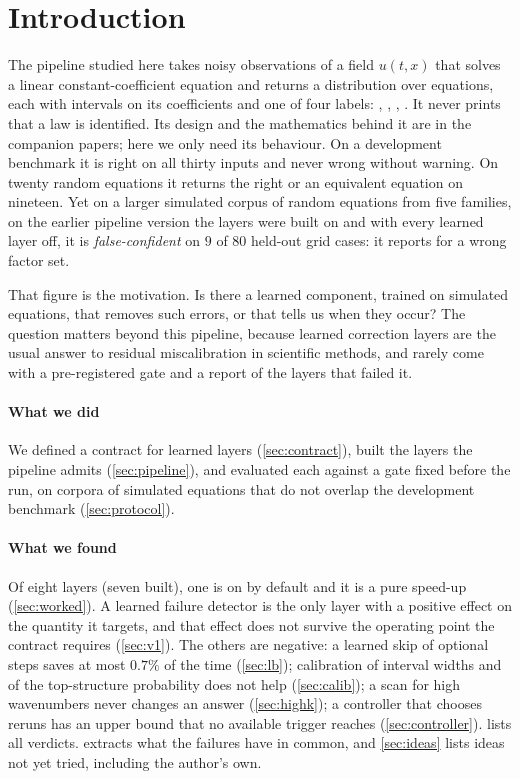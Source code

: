 \section{Introduction}\label{sec:intro}
The pipeline studied here takes noisy observations of a field $u(t,x)$ that solves a linear constant-coefficient equation
and returns a distribution over equations, each with intervals on its coefficients and one of four labels: \FC, \MIS,
\IDK, \UND{}. It never prints that a law is identified. Its design and the mathematics behind it are in the companion
papers; here we only need its behaviour. On a development benchmark it is right on all thirty inputs and never wrong
without warning. On twenty random equations it returns the right or an equivalent equation on nineteen. Yet on a larger
simulated corpus of random equations from five families, on the earlier pipeline version the layers were built on and with every learned layer off, it is \emph{false-confident} on
$9$ of $80$ held-out grid cases: it reports \FC{} for a wrong factor set.

That figure is the motivation. Is there a learned component, trained on simulated equations, that removes such errors,
or that tells us when they occur? The question matters beyond this pipeline, because learned correction layers are
the usual answer to residual miscalibration in scientific methods, and rarely come with a pre-registered gate and a
report of the layers that failed it.

\paragraph{What we did} We defined a contract for learned layers (\cref{sec:contract}), built the layers the pipeline
admits (\cref{sec:pipeline}), and evaluated each against a gate fixed before the run, on corpora of simulated equations that
do not overlap the development benchmark (\cref{sec:protocol}).

\paragraph{What we found} Of eight layers (seven built), one is on by default and it is a pure speed-up (\cref{sec:worked}). A learned
failure detector is the only layer with a positive effect on the quantity it targets, and that effect does not survive the
operating point the contract requires (\cref{sec:v1}). The others are negative: a learned skip of optional steps saves
at most $0.7\%$ of the time (\cref{sec:lb}); calibration of interval widths and of the top-structure probability does not
help (\cref{sec:calib}); a scan for high wavenumbers never changes an answer (\cref{sec:highk}); a controller that
chooses reruns has an upper bound that no available trigger reaches (\cref{sec:controller}).  lists all
verdicts.  extracts what the failures have in common, and \cref{sec:ideas} lists ideas not yet tried,
including the author's own.

